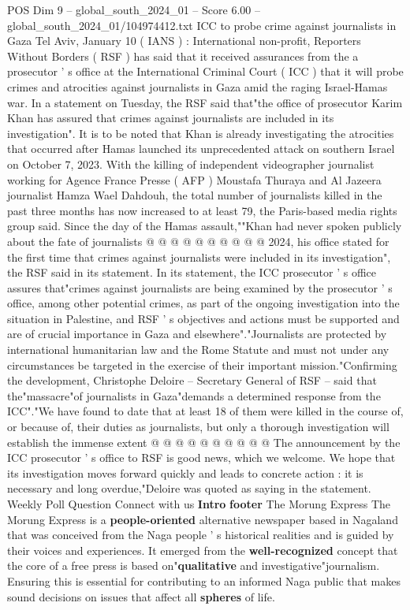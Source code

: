 \begin{textsample}{POS Dim 9 – global\_south\_2024\_01 – Score 6.00 – global\_south\_2024\_01/104974412.txt}  \label{ex:f9_pos_064}
ICC to probe crime against journalists in Gaza Tel Aviv, January 10 ( IANS ) : International non-profit, Reporters Without Borders ( RSF ) has said that it received assurances from the a prosecutor ' s office at the International Criminal Court ( ICC ) that it will probe crimes and atrocities against journalists in Gaza amid the raging Israel-Hamas war.
In a statement on Tuesday, the RSF said that"the office of prosecutor Karim Khan has assured that crimes against journalists are included in its investigation".
It is to be noted that Khan is already investigating the atrocities that occurred after Hamas launched its unprecedented attack on southern Israel on October 7, 2023.
With the killing of independent videographer journalist working for Agence France Presse ( AFP ) Moustafa Thuraya and Al Jazeera journalist Hamza Wael Dahdouh, the total number of journalists killed in the past three months has now increased to at least 79, the Paris-based media rights group said.
Since the day of the Hamas assault,""Khan had never spoken publicly about the fate of journalists @ @ @ @ @ @ @ @ @ @ 2024, his office stated for the first time that crimes against journalists were included in its investigation", the RSF said in its statement.
In its statement, the ICC prosecutor ' s office assures that"crimes against journalists are being examined by the prosecutor ' s office, among other potential crimes, as part of the ongoing investigation into the situation in Palestine, and RSF ' s objectives and actions must be supported and are of crucial importance in Gaza and elsewhere"."Journalists are protected by international humanitarian law and the Rome Statute and must not under any circumstances be targeted in the exercise of their important mission."Confirming the development, Christophe Deloire -- Secretary General of RSF -- said that the"massacre"of journalists in Gaza"demands a determined response from the ICC"."We have found to date that at least 18 of them were killed in the course of, or because of, their duties as journalists, but only a thorough investigation will establish the immense extent @ @ @ @ @ @ @ @ @ @ The announcement by the ICC prosecutor ' s office to RSF is good news, which we welcome.
We hope that its investigation moves forward quickly and leads to concrete action : it is necessary and long overdue,"Deloire was quoted as saying in the statement.
Weekly Poll Question Connect with us \textbf{Intro} \textbf{footer} The Morung Express The Morung Express is a \textbf{people-oriented} alternative newspaper based in Nagaland that was conceived from the Naga people ' s historical realities and is guided by their voices and experiences.
It emerged from the \textbf{well-recognized} concept that the core of a free press is based on"\textbf{qualitative} and investigative"journalism.
Ensuring this is essential for contributing to an informed Naga public that makes sound decisions on issues that affect all \textbf{spheres} of life.

\end{textsample}
